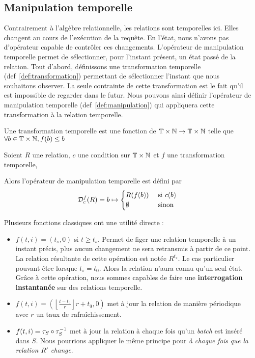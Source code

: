 \subsection{Manipulation temporelle}
Contrairement à l'algèbre relationnelle, les relations sont temporelles ici. Elles changent au cours de l'exécution de la requête. En l'état, nous n'avons pas d'opérateur capable de contrôler ces changements. L'opérateur de manipulation temporelle permet de sélectionner, pour l'instant présent, un état passé de la relation. Tout d'abord, définissons une transformation temporelle (def~\ref{def:transformation}) permettant de sélectionner l'instant que nous souhaitons observer. La seule contrainte de cette transformation est le fait qu'il est impossible de regarder dans le futur. Nous pouvons ainsi définir l'opérateur de manipulation temporelle (def~\ref{def:manipulation}) qui appliquera cette transformation à la relation temporelle.
\begin{defi}\label{def:transformation}
    Une transformation temporelle est une fonction de $\mathbb{T}\times\mathbb{N}\to\mathbb{T}\times\mathbb{N}$ telle que $\forall b\in\mathbb{T}\times\mathbb{N}, f(b) \leq b$
\end{defi}

\begin{defi}\label{def:manipulation}
    Soient $R$ une relation, $c$ une condition sur $\mathbb{T}\times\mathbb{N}$ et $f$ une transformation temporelle,

    Alors l'opérateur de manipulation temporelle est défini par $$\mathcal{D}_c^f(R) = b \mapsto \begin{cases} R(f(b)) & \textrm{ si } c(b) \\ \emptyset & \textrm{ sinon}\end{cases}$$
\end{defi}

Plusieurs fonctions classiques ont une utilité directe :
\begin{itemize}
 \item $f(t,i)=(t_s,0)$ si $t \geq t_s$. Permet de figer une relation temporelle à un instant précis, plus aucun changement ne sera retransmis à partir de ce point. La relation résultante de cette opération est notée $R^{t_s}$. Le cas particulier pouvant être lorsque $t_s=t_0$. Alors la relation n'aura connu qu'un seul état. Grâce à cette opération, nous sommes capables de faire une \textbf{interrogation instantanée} sur des relations temporelle.
 \item $f(t,i)=\left(\left\lfloor\frac{t-t_0}{r}\right\rfloor r + t_0, 0\right)$ met à jour la relation de manière périodique avec $r$ un taux de rafraîchissement.
 \item $f(t,i)=\tau_S\circ\tau^{-1}_S$ met à jour la relation à chaque fois qu'un \textit{batch} est inséré dans $S$. Nous pourrions appliquer le même principe pour \textit{à chaque fois que la relation $R'$ change}.
\end{itemize}

